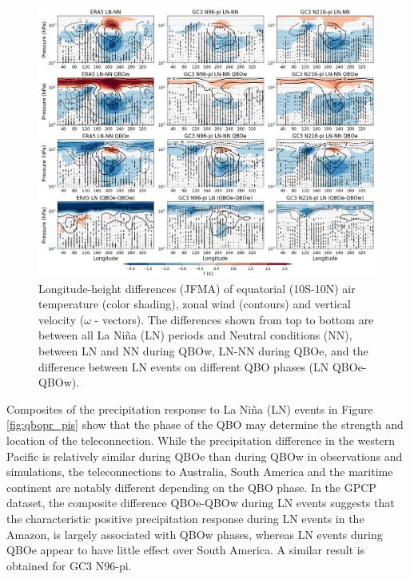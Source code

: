 \begin{figure}[b!]
\includegraphics[width=\linewidth]{figures/walker_wqbo_jfma}
\caption[Walker circulation responses to La Niña under different QBO phases] {Longitude-height differences (JFMA) of equatorial (10S-10N) air temperature (color shading), zonal wind (contours) and vertical velocity ($\omega$ - vectors). The differences shown from top to bottom are between all La Niña (LN) periods and Neutral conditions (NN), between LN and NN during QBOw, LN-NN during QBOe, and the difference between LN events on different QBO phases (LN QBOe-QBOw). 
}
\label{fig:qbowalker_pis}
\end{figure}

Composites of the precipitation response to La Niña (LN) events in Figure \ref{fig:qbopr_pis} show that the phase of the QBO may determine the strength and location of the teleconnection. 
While the precipitation difference in the western Pacific is relatively similar during QBOe than during QBOw in observations and simulations, the teleconnections to Australia, South America and the maritime continent are notably different depending on the QBO phase. 
In the GPCP dataset, the composite difference QBOe-QBOw during LN events suggests that the characteristic positive precipitation response during LN events in the Amazon, is largely associated with QBOw phases, whereas LN events during QBOe appear to have little effect over South America. 
A similar result is obtained for GC3 N96-pi. 

